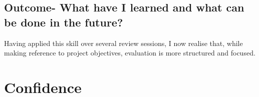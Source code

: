 \documentclass{scrartcl}
\begin{document}
\subsection{Outcome- What have I learned and what can be done in the future?}

Having applied this skill over several review sessions, I now realise that, while making reference to project objectives, evaluation is more structured and focused.

\section{Confidence}



%
%
\end{document}
